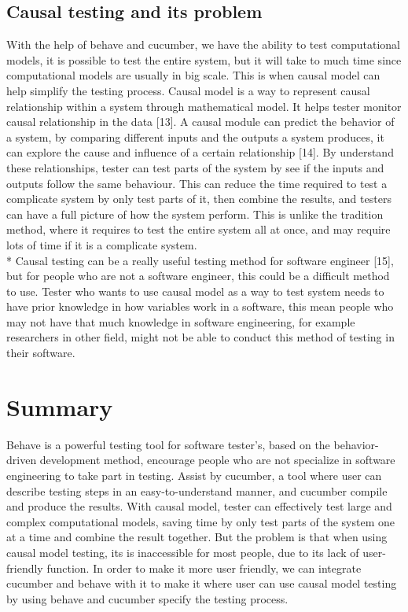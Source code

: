 \subsection{Causal testing and its problem}
With the help of behave and cucumber, we have the ability to test computational models, it is possible to test the entire system, but it will take to much time since computational models are usually in big scale. This is when causal model can help simplify the testing process. Causal model is a way to represent causal relationship within a system through mathematical model. It helps tester monitor causal relationship in the data [13]. A causal module can predict the behavior of a system, by comparing different inputs and the outputs a system produces, it can explore the cause and influence of a certain relationship [14]. By understand these relationships, tester can test parts of the system by see if the inputs and outputs follow the same behaviour. This can reduce the time required to test a complicate system by only test parts of it, then combine the results, and testers can have a full picture of how the system perform. This is unlike the tradition method, where it requires to test the entire system all at once, and may require lots of time if it is a complicate system.\\*
Causal testing can be a really useful testing method for software engineer [15], but for people who are not a software engineer, this could be a difficult method to use. Tester who wants to use causal model as a way to test system needs to have prior knowledge in how variables work in a software, this mean people who may not have that much knowledge in software engineering, for example researchers in other field, might not be able to conduct this method of testing in their software. 


\section{Summary}

Behave is a powerful testing tool for software tester’s, based on the behavior-driven development method, encourage people who are not specialize in software engineering to take part in testing. Assist by cucumber, a tool where user can describe testing steps in an easy-to-understand manner, and cucumber compile and produce the results. With causal model, tester can effectively test large and complex computational models, saving time by only test parts of the system one at a time and combine the result together. But the problem is that when using causal model testing, its is inaccessible for most people, due to its lack of user-friendly function. In order to make it more user friendly, we can integrate cucumber and behave with it to make it where user can use causal model testing by using behave and cucumber specify the testing process.
